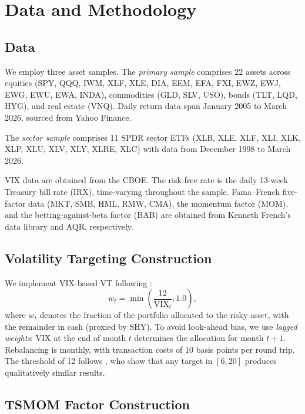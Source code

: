 \section{Data and Methodology}

\subsection{Data}

We employ three asset samples. The \textit{primary sample} comprises 22 assets across equities (SPY, QQQ, IWM, XLF, XLE, DIA, EEM, EFA, FXI, EWZ, EWJ, EWG, EWU, EWA, INDA), commodities (GLD, SLV, USO), bonds (TLT, LQD, HYG), and real estate (VNQ). Daily return data span January 2005 to March 2026, sourced from Yahoo Finance.

The \textit{sector sample} comprises 11 SPDR sector ETFs (XLB, XLE, XLF, XLI, XLK, XLP, XLU, XLV, XLY, XLRE, XLC) with data from December 1998 to March 2026.

VIX data are obtained from the CBOE. The risk-free rate is the daily 13-week Treasury bill rate (IRX), time-varying throughout the sample. Fama--French five-factor data (MKT, SMB, HML, RMW, CMA), the momentum factor (MOM), and the betting-against-beta factor (BAB) are obtained from Kenneth French's data library and AQR, respectively.

\subsection{Volatility Targeting Construction}

We implement VIX-based VT following \citet{bozovic2024}:
\begin{equation}
w_t = \min\!\left(\frac{12}{\text{VIX}_t}, 1.0\right),
\label{eq:vt_weight}
\end{equation}
where $w_t$ denotes the fraction of the portfolio allocated to the risky asset, with the remainder in cash (proxied by SHY). To avoid look-ahead bias, we use \textit{lagged weights}: VIX at the end of month $t$ determines the allocation for month $t+1$. Rebalancing is monthly, with transaction costs of 10 basis points per round trip. The threshold of 12 follows \citet{lai2026a}, who show that any target in $[6, 20]$ produces qualitatively similar results.

\subsection{TSMOM Factor Construction}

